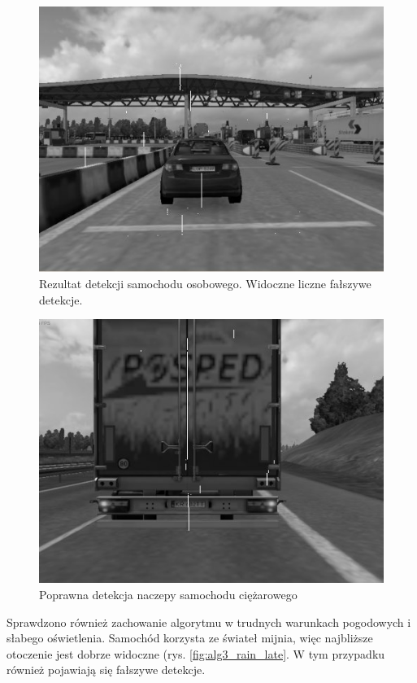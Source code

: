 \begin{figure}
  \centering
  \includegraphics[width=13cm]{img/alg3_res.jpg}
  \caption{Rezultat detekcji samochodu osobowego. Widoczne liczne fałszywe detekcje.}
  \label{fig:alg3_res1}
\end{figure}

\begin{figure}
  \centering
  \includegraphics[width=13cm]{img/alg3_res2.jpg}
  \caption{Poprawna detekcja naczepy samochodu ciężarowego}
  \label{fig:alg3_res2}
\end{figure}

Sprawdzono również zachowanie algorytmu w trudnych warunkach pogodowych i słabego oświetlenia. Samochód korzysta ze świateł mijnia, więc najbliższe otoczenie jest dobrze widoczne (rys. \ref{fig:alg3_rain_late}. W tym przypadku również pojawiają się fałszywe detekcje.

